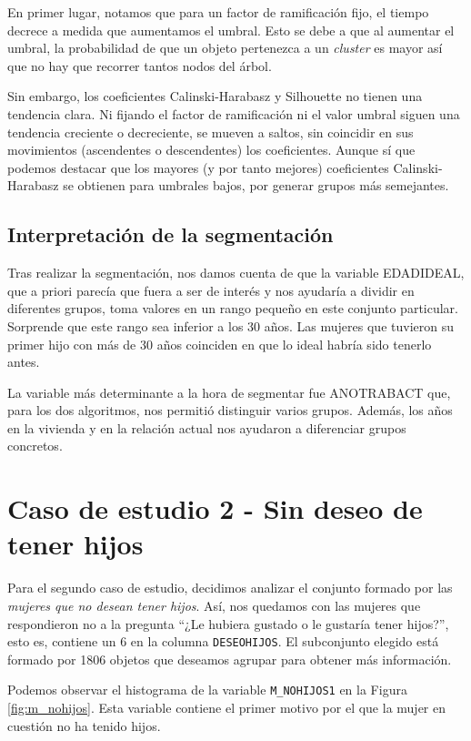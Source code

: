\documentclass[a4paper, 20pt]{article}
\begin{document}
En primer lugar, notamos que para un factor de ramificación fijo, el tiempo decrece a medida que aumentamos el umbral. Esto se debe a que al aumentar el umbral, la probabilidad de que un objeto pertenezca a un \textit{cluster} es mayor así que no hay que recorrer tantos nodos del árbol.

Sin embargo, los coeficientes Calinski-Harabasz y Silhouette no tienen una tendencia clara. Ni fijando el factor de ramificación ni el valor umbral siguen una tendencia creciente o decreciente, se mueven a saltos, sin coincidir en sus movimientos (ascendentes o descendentes) los coeficientes. Aunque sí que podemos destacar que los mayores (y por tanto mejores) coeficientes Calinski-Harabasz se obtienen para umbrales bajos, por generar grupos más semejantes.

\subsection{Interpretación de la segmentación}
Tras realizar la segmentación, nos damos cuenta de que la variable EDADIDEAL, que a priori parecía que fuera a ser de interés y nos ayudaría a dividir en diferentes grupos, toma valores en un rango pequeño en este conjunto particular. Sorprende que este rango sea inferior a los 30 años. Las mujeres que tuvieron su primer hijo con más de 30 años coinciden en que lo ideal habría sido tenerlo antes.

La variable más determinante a la hora de segmentar fue ANOTRABACT que, para los dos algoritmos, nos permitió distinguir varios grupos. Además, los años en la vivienda y en la relación actual nos ayudaron a diferenciar grupos concretos. 

\section{Caso de estudio 2 - Sin deseo de tener hijos}

Para el segundo caso de estudio, decidimos analizar el conjunto formado por las \textit{mujeres que no desean tener hijos}. Así, nos quedamos con las mujeres que respondieron no a la pregunta ``¿Le hubiera gustado o le gustaría tener hijos?'', esto es, contiene un 6 en la columna \texttt{DESEOHIJOS}. El subconjunto elegido está formado por 1806 objetos que deseamos agrupar para obtener más información.

Podemos observar el histograma de la variable \texttt{M\_NOHIJOS1} en la Figura \ref{fig:m_nohijos}. Esta variable contiene el primer motivo por el que la mujer en cuestión no ha tenido hijos.
\end{document}
